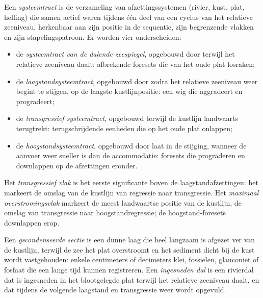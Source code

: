 \begin{definition}[Systeemtract]\label{def:b3:sequence-stratigraphy:tract}
Een \emph{systeemtract} is de verzameling van
afzettingssystemen (rivier, kust, plat, helling) die samen actief waren tijdens
één deel van een cyclus van het relatieve zeeniveau, herkenbaar aan zijn positie in de
sequentie, zijn begrenzende vlakken en zijn stapelingspatroon. Er worden vier
onderscheiden:
\begin{itemize}
\item de \emph{systeemtract van de dalende zeespiegel},
  opgebouwd door  terwijl het relatieve zeeniveau daalt:
  afbrekende foresets die van het oude plat losraken;
\item de \emph{laagstandsysteemtract},
  opgebouwd door  zodra het relatieve zeeniveau weer begint te stijgen,
  op de laagste kustlijnpositie: een wig die aggradeert en progradeert;
\item de \emph{transgressief systeemtract},
  opgebouwd terwijl de kustlijn landwaarts terugtrekt: terugschrijdende eenheden
  die op het oude plat onlappen;
\item de \emph{hoogstandsysteemtract},
  opgebouwd door  laat in de stijging, wanneer de aanvoer weer sneller is
  dan de accommodatie: foresets die prograderen en downlappen op de afzettingen eronder.
\end{itemize}
\end{definition}

\begin{definition}\label{def:b3:sequence-stratigraphy:surfaces}
Het \emph{transgressief vlak} is het eerste
significante  boven de laagstandafzettingen: het markeert de omslag
van de kustlijn van regressie naar transgressie. Het \emph{maximaal
overstromingsvlak} markeert de meest landwaartse positie van
de kustlijn, de omslag van transgressie naar hoogstandregressie; de
hoogstand-foresets downlappen erop.
\end{definition}

\begin{definition}\label{def:b3:sequence-stratigraphy:condensed}
Een \emph{gecondenseerde sectie} is een dunne laag die
heel langzaam is afgezet ver van de kustlijn, terwijl de zee het plat overstroomt
en het sediment dicht bij de kust wordt vastgehouden: enkele centimeters of decimeters
klei, fossielen, glauconiet of fosfaat die een lange tijd kunnen registreren. Een
\emph{ingesneden dal} is een rivierdal dat is ingesneden in het
blootgelegde plat terwijl het relatieve zeeniveau daalt, en dat tijdens de
volgende laagstand en transgressie weer wordt opgevuld.
\end{definition}

